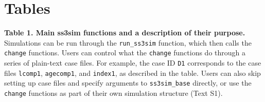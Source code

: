 \documentclass[10pt]{article}
\begin{document}
\clearpage

\section*{Tables}

\textbf{Table 1. Main ss3sim functions and a description of their purpose.}
Simulations can be run through the \texttt{run\_ss3sim} function, which then
calls the \texttt{change} functions. Users can control what the \texttt{change}
functions do through a series of plain-text case files. For example, the case
ID \texttt{D1} corresponds to the case files \texttt{lcomp1},
\texttt{agecomp1}, and \texttt{index1}, as described in the table. Users can
also skip setting up case files and specify arguments to \texttt{ss3sim\_base}
directly, or use the \texttt{change} functions as part of their own simulation
structure (Text S1).
\end{document}
